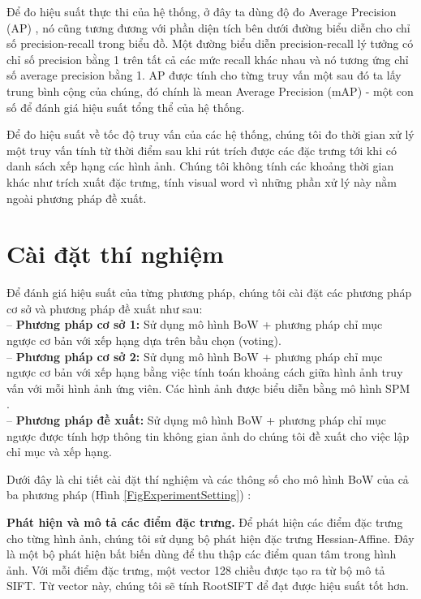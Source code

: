 Để đo hiệu suất thực thi của hệ thống, ở đây ta dùng độ đo Average Precision (AP) \cite{philbin2007object}, nó cũng tương đương với phần diện tích bên dưới đường biểu diễn cho chỉ số precision-recall trong biểu đồ. Một đường biểu diễn precision-recall lý tưởng có chỉ số precision bằng 1 trên tất cả các mức recall khác nhau và nó tương ứng chỉ số average precision bằng 1. AP được tính cho từng truy vấn một sau đó ta lấy trung bình cộng của chúng, đó chính là mean Average Precision (mAP) - một con số để đánh giá hiệu suất tổng thể của hệ thống.

Để đo hiệu suất về tốc độ truy vấn của các hệ thống, chúng tôi đo thời gian xử lý một truy vấn tính từ thời điểm sau khi rút trích được các đặc trưng tới khi có danh sách xếp hạng các hình ảnh. Chúng tôi không tính các khoảng thời gian khác như trích xuất đặc trưng, tính visual word vì những phần xử lý này nằm ngoài phương pháp đề xuất.

\section{Cài đặt thí nghiệm}
\label{experimental-setting}
Để đánh giá hiệu suất của từng phương pháp, chúng tôi cài đặt các phương pháp cơ sở và phương pháp đề xuất như sau:\\
-- \textbf{Phương pháp cơ sở 1:} Sử dụng mô hình BoW + phương pháp chỉ mục ngược cơ bản với xếp hạng dựa trên bầu chọn (voting).\\
-- \textbf{Phương pháp cơ sở 2:} Sử dụng mô hình BoW + phương pháp chỉ mục ngược cơ bản với xếp hạng bằng việc tính toán khoảng cách giữa hình ảnh truy vấn với mỗi hình ảnh ứng viên. Các hình ảnh được biểu diễn bằng mô hình SPM \cite{lazebnik2006beyond}.\\
-- \textbf{Phương pháp đề xuất:} Sử dụng mô hình BoW + phương pháp chỉ mục ngược được tính hợp thông tin không gian ảnh do chúng tôi đề xuất cho việc lập chỉ mục và xếp hạng.

Dưới đây là chi tiết cài đặt thí nghiệm và các thông số cho mô hình BoW của cả ba phương pháp (Hình \ref{FigExperimentSetting}) :

\textbf{Phát hiện và mô tả các điểm đặc trưng.} Để phát hiện các điểm đặc trưng cho từng hình ảnh, chúng tôi sử dụng bộ phát hiện đặc trưng Hessian-Affine\cite{mikolajczyk2005comparison}. Đây là một bộ phát hiện bất biến dùng để thu thập các điểm quan tâm trong hình ảnh. Với mỗi điểm đặc trưng, một vector 128 chiều được tạo ra từ bộ mô tả SIFT. Từ vector này, chúng tôi sẽ tính RootSIFT\cite{arandjelovic2012three} để đạt được hiệu suất tốt hơn.

